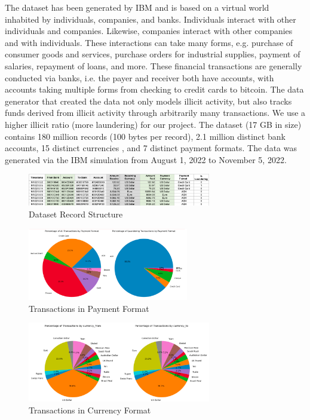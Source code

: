 \textnormal{The dataset has been generated by IBM and is based on a virtual world inhabited by individuals, companies, and banks. Individuals interact with other individuals and companies. Likewise, companies interact with other companies and with individuals. These interactions can take many forms, e.g. purchase of consumer goods and services, purchase orders for industrial supplies, payment of salaries, repayment of loans, and more. These financial transactions are generally conducted via banks, i.e. the payer and receiver both have accounts, with accounts taking multiple forms from checking to credit cards to bitcoin.
The data generator that created the data not only models illicit activity, but also tracks funds derived from illicit activity through arbitrarily many transactions. We use a higher illicit ratio (more laundering) for our project.\cite{IBMML}
The dataset (17 GB in size) contains 180 million records (100 bytes per record), 2.1 million distinct bank accounts, 15 distinct currencies
, and 7 distinct payment formats. The data was generated via the IBM simulation from August 1, 2022 to November 5, 2022.}\cite{Dataset}

\begin{figure}[htp]
    \centering
    \includegraphics[width=8cm]{imgs/snapshot.png}
    \caption{Dataset Record Structure}
    \label{fig:DataFlowDiagram}
\end{figure}

\begin{figure}[htbp]
    \centering
    \includegraphics[width=7cm]{imgs/payment.png}
    \caption{Transactions in Payment Format}
    \label{fig:Data23}
\end{figure}

\begin{figure}[h]
    \centering
    \includegraphics[width=8cm]{imgs/currency.png}
    \caption{Transactions in Currency Format}
    \label{fig:Diagram}
\end{figure}
